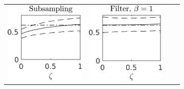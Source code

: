 \documentclass[10pt]{article}
\begin{document}
\begin{figure}[t]
	\vspace{0.5cm}
	\begin{subfigure}{\linewidth}
		\centering
		\begin{tabular}{cccc}
			\includegraphics[]{Figures/A_sub_s10.png} & \includegraphics[]{Figures/A_filt_s10_b1.png} &

\end{tabular}
\end{subfigure}
\end{figure}
\end{document}
